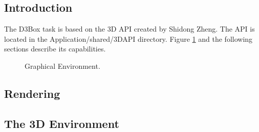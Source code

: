 \documentclass[letterpaper,oneside,12pt]{article}
\begin{document}
\subsection{Introduction}

The D3Box task is based on the 3D API created by Shidong Zheng. The API
is located in the Application/shared/3DAPI directory. Figure \ref{fig:environment}
and the following sections describe its capabilities.


\begin{figure}[ht]
 \centerline{}
 \caption{Graphical Environment.}
 \label{fig:environment}
\end{figure}

\subsection{Rendering}



\subsection{The 3D Environment}
\end{document}
